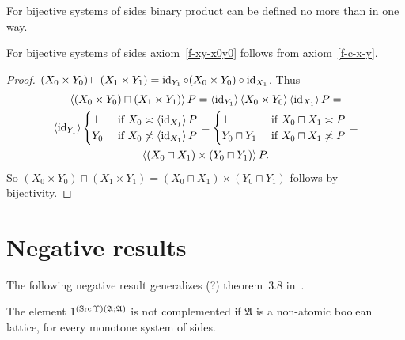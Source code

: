 \begin{cor}
For bijective systems of sides binary product can be defined no more than in one way.
\end{cor}

\begin{prop}
For bijective systems of sides axiom~\ref{f-xy-x0y0} follows from axiom~\ref{f-c-x-y}.
\end{prop}

\begin{proof}
$(X_0\times Y_0)\sqcap(X_1\times Y_1) = \operatorname{id}_{Y_1}\circ(X_0\times Y_0)\circ\operatorname{id}_{X_1}$.
Thus
\begin{multline*}
\left\langle (X_0\times Y_0)\sqcap(X_1\times Y_1)\right\rangle P = \left\langle \operatorname{id}_{Y_1}\right\rangle\left\langle X_0\times Y_0\right\rangle\left\langle \operatorname{id}_{X_1}\right\rangle P = \\
\left\langle \operatorname{id}_{Y_1}\right\rangle\begin{cases}\bot&\text{ if }X_0\asymp\left\langle \operatorname{id}_{X_1}\right\rangle P\\Y_0&\text{ if }X_0\not\asymp\left\langle \operatorname{id}_{X_1}\right\rangle P\end{cases} =
\begin{cases}\bot&\text{ if }X_0\sqcap X_1\asymp P\\Y_0\sqcap Y_1&\text{ if }X_0\sqcap X_1\not\asymp P\end{cases} = \\
\left\langle (X_0\sqcap X_1)\times(Y_0\sqcap Y_1)\right\rangle P.
\end{multline*}
So $(X_0\times Y_0)\sqcap(X_1\times Y_1) = (X_0\sqcap X_1)\times(Y_0\sqcap Y_1)$ follows by bijectivity.
\end{proof}





\section{Negative results}

The following negative result generalizes (?) theorem~3.8 in~\cite{tprod-dist-lat}.

\begin{prop}
  The element $1^{(\operatorname{Src}\Upsilon)(\mathfrak{A}; \mathfrak{A})}$ is not
  complemented if $\mathfrak{A}$ is a non-atomic boolean lattice,
  for every monotone system of sides.
\end{prop}

